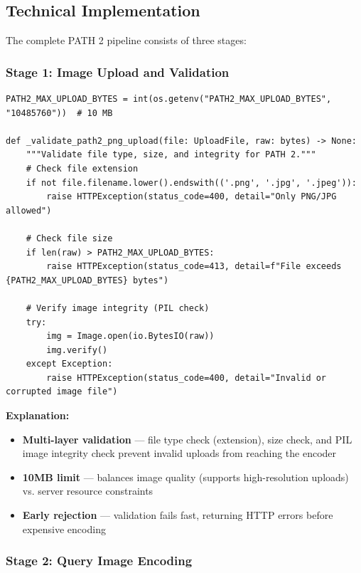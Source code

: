 \documentclass[12pt, twoside]{report}
\begin{document}
\subsection{Technical Implementation}

The complete PATH 2 pipeline consists of three stages:

\subsubsection{Stage 1: Image Upload and Validation}

\begin{lstlisting}[caption={PATH 2 Upload Validation --- api/main.py}]
PATH2_MAX_UPLOAD_BYTES = int(os.getenv("PATH2_MAX_UPLOAD_BYTES", "10485760"))  # 10 MB

def _validate_path2_png_upload(file: UploadFile, raw: bytes) -> None:
    """Validate file type, size, and integrity for PATH 2."""
    # Check file extension
    if not file.filename.lower().endswith(('.png', '.jpg', '.jpeg')):
        raise HTTPException(status_code=400, detail="Only PNG/JPG allowed")
    
    # Check file size
    if len(raw) > PATH2_MAX_UPLOAD_BYTES:
        raise HTTPException(status_code=413, detail=f"File exceeds {PATH2_MAX_UPLOAD_BYTES} bytes")
    
    # Verify image integrity (PIL check)
    try:
        img = Image.open(io.BytesIO(raw))
        img.verify()
    except Exception:
        raise HTTPException(status_code=400, detail="Invalid or corrupted image file")
\end{lstlisting}

\textbf{Explanation:}
\begin{itemize}
    \item \textbf{Multi-layer validation} --- file type check (extension), size check, and PIL image integrity check prevent invalid uploads from reaching the encoder
    \item \textbf{10MB limit} --- balances image quality (supports high-resolution uploads) vs. server resource constraints
    \item \textbf{Early rejection} --- validation fails fast, returning HTTP errors before expensive encoding
\end{itemize}

\subsubsection{Stage 2: Query Image Encoding}
\end{document}
